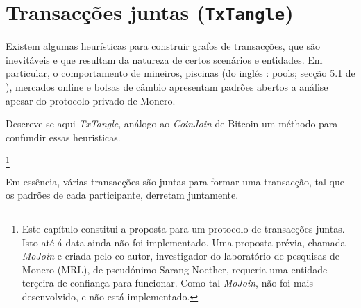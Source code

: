 \chapter{Transacções juntas ({\tt TxTangle})}
\label{chapter:txtangle}

Existem algumas heurísticas para construir grafos de transacções, que são inevitáveis e que resultam da natureza de certos scenários e entidades. Em particular, o comportamento de mineiros, piscinas (do inglés : pools; secção 5.1 de \cite{AnalysisOfLinkability}),
mercados online e bolsas de câmbio apresentam padrões abertos a análise apesar do protocolo privado de Monero.


Descreve-se aqui {\em TxTangle}, análogo ao {\em CoinJoin} de Bitcoin um méthodo para confundir essas heuristicas. 

\footnote{Este capítulo constitui a proposta para um protocolo de transacções juntas. Isto até á data ainda não foi implementado. Uma proposta prévia, chamada {\em MoJoin} e criada pelo co-autor, investigador do laboratório de pesquisas de Monero (MRL), de pseudónimo Sarang Noether, requeria uma entidade terçeira de confiança para funcionar. Como tal {\em MoJoin}, não foi mais desenvolvido, e não está implementado.}     

Em essência, várias transacções são juntas para formar uma transacção, tal que os padrões de cada participante, derretam juntamente.


